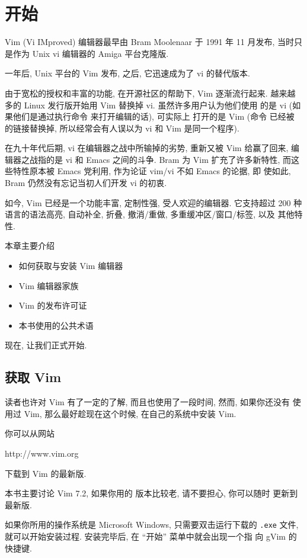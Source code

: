 \chapter{开始}
\label{chap:getting_started_with_vim}

Vim (Vi IMproved) 编辑器最早由 Bram Moolenaar 于 1991 年 11 月发布,
当时只是作为 Unix vi 编辑器的 Amiga 平台克隆版.

一年后, Unix 平台的 Vim 发布, 之后, 它迅速成为了 vi 的替代版本.

由于宽松的授权和丰富的功能, 在开源社区的帮助下, Vim 逐渐流行起来.
越来越多的 Linux 发行版开始用 Vim 替换掉 vi. 虽然许多用户认为他们使用
的是 vi (如果他们是通过执行命令 \vi 来打开编辑的话), 可实际上
打开的是 Vim (命令 \vi 已经被 \vim 的链接替换掉, 所以经常会有人误以为
vi 和 Vim 是同一个程序).

在九十年代后期, vi 在编辑器之战中所输掉的劣势, 重新又被 Vim 给赢了回来,
编辑器之战指的是 vi 和 Emacs 之间的斗争. Bram 为 Vim 扩充了许多新特性, 
而这些特性原本被  Emacs 党利用, 作为论证 vim/vi 不如 Emacs 的论据, 即
使如此, Bram 仍然没有忘记当初人们开发 vi 的初衷.

如今, Vim 已经是一个功能丰富, 定制性强, 受人欢迎的编辑器. 它支持超过 200 
种语言的语法高亮, 自动补全, 折叠, 撤消/重做, 多重缓冲区/窗口/标签, 以及
其他特性.

本章主要介绍
\begin{itemize}
    \item 如何获取与安装 Vim 编辑器
    \item Vim 编辑器家族
    \item Vim 的发布许可证 
    \item 本书使用的公共术语
\end{itemize}
现在, 让我们正式开始.

\section{获取 Vim}
\label{sec:getting_vim}

读者也许对 Vim 有了一定的了解, 而且也使用了一段时间, 然而, 如果你还没有
使用过 Vim, 那么最好趁现在这个时候, 在自己的系统中安装 Vim.

你可以从网站
\begin{gencode}
http://www.vim.org
\end{gencode}
下载到 Vim 的最新版.
\begin{warning}
本书主要讨论 Vim 7.2, 如果你用的 版本比较老, 请不要担心, 你可以随时
更新到最新版.
\end{warning}
如果你所用的操作系统是 Microsoft Windows, 只需要双击运行下载的 \texttt{.exe}
文件, 就可以开始安装过程. 安装完毕后, 在 ``开始'' 菜单中就会出现一个指
向 gVim 的快捷键.

